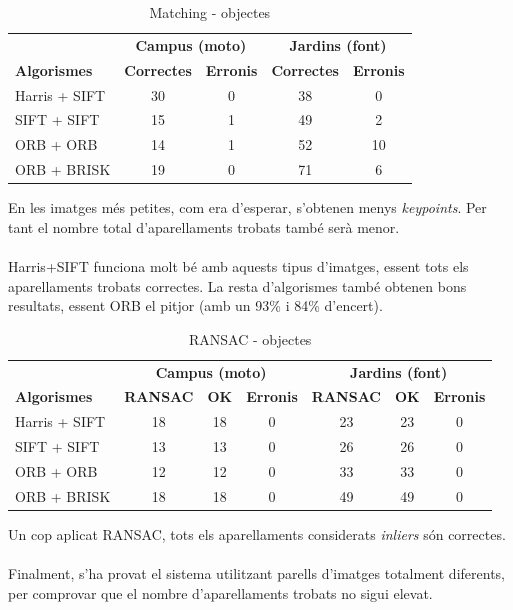 		\begin{table}[H]
			\begin{center}
				\begin{tabular}{l | c c | c c}
					& \multicolumn{2}{c|}{\textbf{Campus (moto)}} & \multicolumn{2}{c}{\textbf{Jardins (font)}} \\
					\textbf{Algorismes} & \textbf{Correctes} & \textbf{Erronis} & \textbf{Correctes} & \textbf{Erronis} \\ \hline
					Harris + SIFT & 30 & 0 & 38 & 0 \\
					SIFT + SIFT & 15 & 1 & 49 & 2 \\
					ORB + ORB & 14 & 1 & 52 & 10 \\
					ORB + BRISK & 19 & 0 & 71 & 6 \\
				\end{tabular}
			\end{center}
			\caption{Matching - objectes}
		\end{table}
		\noindent
		En les imatges més petites, com era d'esperar, s'obtenen menys \textit{keypoints}. Per tant el nombre total d'aparellaments trobats també serà menor.\\\\
		Harris+SIFT funciona molt bé amb aquests tipus d'imatges, essent tots els aparellaments trobats correctes. La resta d'algorismes també obtenen bons resultats,
		essent ORB el pitjor (amb un 93\% i 84\% d'encert).\\
		\begin{table}[H]
			\begin{center}
				\begin{tabular}{l | c c c | c c c}
					& \multicolumn{3}{c|}{\textbf{Campus (moto)}} & \multicolumn{3}{c}{\textbf{Jardins (font)}} \\
					\textbf{Algorismes} & \textbf{RANSAC} & \textbf{OK} & \textbf{Erronis} & \textbf{RANSAC} & \textbf{OK} & \textbf{Erronis} \\ \hline
					Harris + SIFT & 18 & 18 & 0 & 23 & 23 & 0 \\
					SIFT + SIFT & 13 & 13 & 0 & 26 & 26 & 0 \\
					ORB + ORB & 12 & 12 & 0 & 33 & 33 & 0 \\
					ORB + BRISK & 18 & 18 & 0 & 49 & 49 & 0 \\
				\end{tabular}
			\end{center}
			\caption{RANSAC - objectes}
		\end{table}
		\noindent
		Un cop aplicat RANSAC, tots els aparellaments considerats \textit{inliers} són correctes.\\\\
		Finalment, s'ha provat el sistema utilitzant parells d'imatges totalment diferents, per comprovar que el nombre d'aparellaments trobats no sigui elevat.\\

